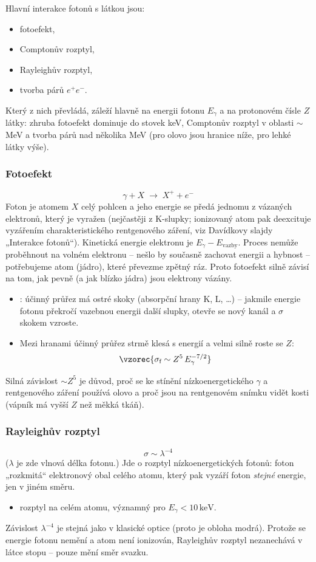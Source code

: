 Hlavní  interakce fotonů s látkou jsou:
\begin{itemize}
  \item fotoefekt,
  \item Comptonův rozptyl,
  \item Rayleighův rozptyl,
  \item tvorba párů \(e^+e^-\).
\end{itemize}
Který z nich převládá, záleží hlavně na energii fotonu \(E_\gamma\)
a na protonovém čísle \(Z\) látky: zhruba fotoefekt dominuje do stovek keV,
Comptonův rozptyl v oblasti \(\sim\)\,MeV a tvorba párů nad několika MeV
(pro olovo jsou hranice níže, pro lehké látky výše).

\subsubsection{Fotoefekt}
\[
  \gamma + X \;\to\; X^{+} + e^-
\]
Foton je atomem \(X\) celý pohlcen a jeho energie se předá jednomu
z vázaných elektronů, který je vyražen (nejčastěji z K-slupky; ionizovaný
atom pak deexcituje vyzářením charakteristického rentgenového záření,
viz Davídkovy slajdy „Interakce fotonů``). Kinetická energie elektronu je
\(E_\gamma - E_{\text{vazby}}\). Proces nemůže proběhnout na volném
elektronu – nešlo by současně zachovat energii a hybnost – potřebujeme
atom (jádro), které převezme zpětný ráz. Proto fotoefekt silně závisí na
tom, jak pevně (a jak blízko jádra) jsou elektrony vázány.
\begin{itemize}
  \item {}: účinný průřez má ostré skoky
  (absorpční hrany K, L, \dots) – jakmile energie fotonu překročí vazebnou
  energii další slupky, otevře se nový kanál a \(\sigma\) skokem vzroste.
  \item Mezi hranami účinný průřez strmě klesá s energií a velmi silně roste
  se \(Z\):
  \[
    \vzorec{\sigma_{\text{f}} \sim Z^5\,E_\gamma^{-7/2}}
  \]
\end{itemize}
Silná závislost \(\sim Z^5\) je důvod, proč se ke stínění nízkoenergetického
\(\gamma\) a rentgenového záření používá olovo a proč jsou na rentgenovém
snímku vidět kosti (vápník má vyšší \(Z\) než měkká tkáň).

\subsubsection{Rayleighův rozptyl}
\[
  \sigma \sim \lambda^{-4}
\]
(\(\lambda\) je zde vlnová délka fotonu.) Jde o  rozptyl
nízkoenergetických fotonů: foton „rozkmitá`` elektronový obal celého atomu,
který pak vyzáří foton \emph{stejné} energie, jen v jiném směru.
\begin{itemize}
  \item {} rozptyl na celém atomu, významný
  pro \(E_\gamma < 10\,\text{keV}\).
\end{itemize}
Závislost \(\lambda^{-4}\) je stejná jako v klasické optice (proto je obloha
modrá). Protože se energie fotonu nemění a atom není ionizován, Rayleighův
rozptyl nezanechává v látce stopu – pouze mění směr svazku.

